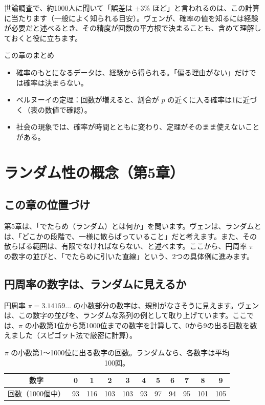 \documentclass[a4paper,11pt,openany]{ltjsbook}
\begin{document}
世論調査で、約1000人に聞いて「誤差は $\pm3\%$ ほど」と言われるのは、この計算に当たります（一般によく知られる目安）。ヴェンが、確率の値を知るには経験が必要だと述べるとき、その精度が回数の平方根で決まることも、含めて理解しておくと役に立ちます。

\begin{pointbox}{この章のまとめ}
\begin{itemize}[leftmargin=*]
\item 確率のもとになるデータは、経験から得られる。「偏る理由がない」だけでは確率は決まらない。
\item ベルヌーイの定理：回数が増えると、割合が $p$ の近くに入る確率は1に近づく（表の数値で確認）。
\item 社会の現象では、確率が時間とともに変わり、定理がそのまま使えないことがある。
\end{itemize}
\end{pointbox}

\chapter{ランダム性の概念（第5章）}

\section{この章の位置づけ}

第5章は、「でたらめ（ランダム）とは何か」を問います。ヴェンは、ランダムとは、「どこかの段階で、一様に散らばっていること」だと考えます。また、その散らばる範囲は、有限でなければならない、と述べます。ここから、円周率 $\pi$ の数字の並びと、「でたらめに引いた直線」という、2つの具体例に進みます。

\section{円周率の数字は、ランダムに見えるか}

円周率 $\pi=3.14159\ldots$ の小数部分の数字は、規則がなさそうに見えます。ヴェンは、この数字の並びを、ランダムな系列の例として取り上げています。ここでは、$\pi$ の小数第1位から第1000位までの数字を計算して、0から9の出る回数を数えました（スピゴット法で厳密に計算）。

\begin{table}[htbp]
\centering
\begin{tabular}{c|cccccccccc}
\toprule
数字 & 0 & 1 & 2 & 3 & 4 & 5 & 6 & 7 & 8 & 9\\
\midrule
回数（1000個中） & 93 & 116 & 103 & 103 & 93 & 97 & 94 & 95 & 101 & 105\\
\bottomrule
\end{tabular}
\caption{$\pi$ の小数第1〜1000位に出る数字の回数。ランダムなら、各数字は平均100回。}
\end{table}
\end{document}
